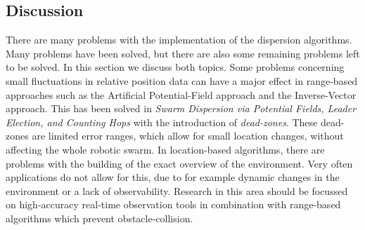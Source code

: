 \subsection{Discussion}
  \begin{table}[H]
  \renewcommand{\arraystretch}{1.3}
  \label{table_alg_dispersion}
  \centering
{}
  \caption{Overview of Common Dispersion Algorithms}
  \end{table}
There are many problems with the implementation of the dispersion algorithms. 
Many problems have been solved, but there are also some remaining problems left to be solved. 
In this section we discuss both topics.
Some problems concerning small fluctuations in relative position data can have a major effect in range-based approaches such as the Artificial Potential-Field approach and the Inverse-Vector approach. 
This has been solved in \emph{Swarm Dispersion via Potential Fields, Leader Election, and Counting Hops} with the introduction of \emph{dead-zones}. 
These dead-zones are limited error ranges, which allow for small location changes, without affecting the whole robotic swarm.
In location-based algorithms, there are problems with the building of the exact overview of the environment. 
Very often applications do not allow for this, due to for example dynamic changes in the environment or a lack of observability. 
Research in this area should be focussed on high-accuracy real-time observation tools in combination with range-based algorithms which prevent obstacle-collision. 
